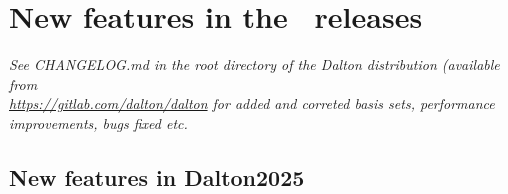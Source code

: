 \chapter{New features in the \dalton\ releases}


{\it See {\rm CHANGELOG.md} in the root directory of the Dalton distribution (available from \\ {\rm \url{https://gitlab.com/dalton/dalton}} for 
added and correted basis sets, performance improvements, bugs fixed etc. }

\section{New features in Dalton2025}

